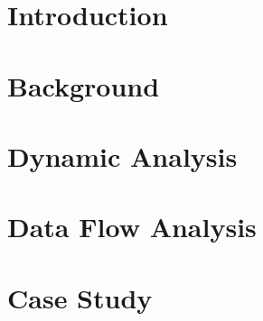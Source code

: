 \documentclass[twoside,11pt,openright]{report}
\theoremstyle{definition}
\begin{document}
\chapter{Introduction}
\label{ch:intro}


\chapter{Background}
\label{ch:background}


\chapter{Dynamic Analysis}
\label{ch:study}







\chapter{Data Flow Analysis}
\label{ch:analysis}
%











\chapter{Case Study}
\label{ch:evaluation}








\end{document}
